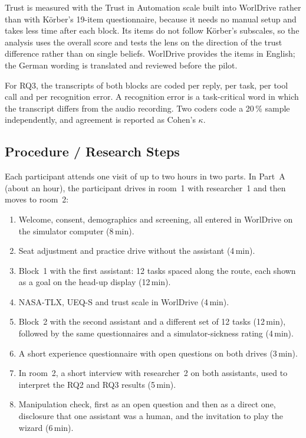 \documentclass[
    a4paper,
    11pt,
    DIV=11,
    bigheadings,
    idxtotoc,
    listof=totoc,
    bibtotoc,
    halfparskip,
    cleardoubleempty,
    openright,
    oneside
]{scrartcl}
\begin{document}
Trust is measured with the Trust in Automation scale built into WorlDrive rather than with Körber's 19-item questionnaire, because it needs no manual setup and takes less time after each block.
Its items do not follow Körber's subscales, so the analysis uses the overall score and tests the lens on the direction of the trust difference rather than on single beliefs.
WorlDrive provides the items in English; the German wording is translated and reviewed before the pilot.

For RQ3, the transcripts of both blocks are coded per reply, per task, per tool call and per recognition error.
A recognition error is a task-critical word in which the transcript differs from the audio recording.
Two coders code a 20\,\% sample independently, and agreement is reported as Cohen's $\kappa$.

\subsection{Procedure / Research Steps}

Each participant attends one visit of up to two hours in two parts.
In Part~A (about an hour), the participant drives in room~1 with researcher~1 and then moves to room~2:

\begin{enumerate}
    \item Welcome, consent, demographics and screening, all entered in WorlDrive on the simulator computer (8\,min).
    \item Seat adjustment and practice drive without the assistant (4\,min).
    \item Block~1 with the first assistant: 12 tasks spaced along the route, each shown as a goal on the head-up display (12\,min).
    \item NASA-TLX, UEQ-S and trust scale in WorlDrive (4\,min).
    \item Block~2 with the second assistant and a different set of 12 tasks (12\,min), followed by the same questionnaires and a simulator-sickness rating (4\,min).
    \item A short experience questionnaire with open questions on both drives (3\,min).
    \item In room~2, a short interview with researcher~2 on both assistants, used to interpret the RQ2 and RQ3 results (5\,min).
    \item Manipulation check, first as an open question and then as a direct one, disclosure that one assistant was a human, and the invitation to play the wizard (6\,min).
\end{enumerate}
\end{document}
